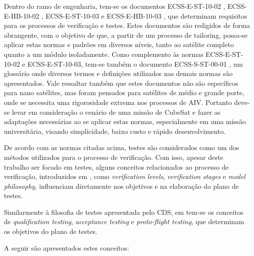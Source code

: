 Dentro do ramo de engenharia, tem-se os documentos ECSS-E-ST-10-02 \cite{ecss-e-st-10-02}, ECSS-E-HB-10-02 \cite{ecss-e-hb-10-02}, ECSS-E-ST-10-03 \cite{ecss-e-st-10-03} e ECSS-E-HB-10-03 \cite{ecss-e-hb-10-03}, que determinam requisitos para os processos de verificação e testes. Estes documentos são redigidos de forma abrangente, com o objetivo de que, a partir de um processo de tailoring, possa-se aplicar estas normas e padrões em diversos níveis, tanto ao satélite completo quanto a um módulo isoladamente.
Como complemento às normas ECSS-E-ST-10-02 e ECSS-E-ST-10-03, tem-se também o documento ECSS-S-ST-00-01 \cite{ecss-s-st-00-01}, um glossário onde diversos termos e definições utilizados nas demais normas são apresentados.
Vale ressaltar também que estes documentos não são específicos para nano satélites, mas foram pensados para satélites de médio e grande porte, onde se necessita uma rigorosidade extrema nos processos de \gls{AIV}.
Portanto deve-se levar em consideração o cenário de uma missão de CubeSat e fazer as adaptações necessárias ao se aplicar estas normas, especialmente em uma missão universitária, visando simplicidade, baixo custo e rápido desenvolvimento.

De acordo com as normas citadas acima, testes são considerados como um dos métodos utilizados para o processo de verificação.
Com isso, apesar deste trabalho ser focado em testes, alguns conceitos relacionados ao processo de verificação, introduzidos em \cite{ecss-e-st-10-02}, como \textit{verification levels}, \textit{verification stages} e \textit{model philosophy}, influenciam diretamente nos objetivos e na elaboração do plano de testes.

Similarmente à filosofia de testes apresentada pelo \gls{CDS}, em \textcite{ecss-e-st-10-03} tem-se os conceitos de \textit{qualification testing}, \textit{acceptance testing} e \textit{proto-flight testing}, que determinam os objetivos do plano de testes.

A seguir são apresentados estes conceitos:

